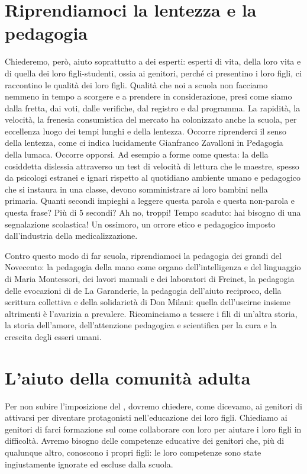 \section*{Riprendiamoci la lentezza e la pedagogia}

Chiederemo, però, aiuto soprattutto a dei  esperti: esperti di vita, della loro vita e di quella dei loro figli-studenti, ossia ai genitori, perché ci presentino i loro figli, ci raccontino le qualità dei loro figli. Qualità che noi a scuola non facciamo nemmeno in tempo a scorgere e a prendere in considerazione, presi come siamo dalla fretta, dai voti, dalle verifiche, dal registro e dal programma. La rapidità, la velocità, la frenesia consumistica del mercato ha colonizzato anche la scuola, per eccellenza luogo dei tempi lunghi e della lentezza. Occorre riprenderci il senso della lentezza, come ci indica lucidamente Gianfranco Zavalloni in Pedagogia della lumaca. Occorre opporsi. Ad esempio a forme come questa: la  della cosiddetta dislessia attraverso un test di velocità di lettura che le maestre, spesso  da psicologi estranei e ignari rispetto al quotidiano ambiente umano e pedagogico che si instaura in una classe, devono somministrare ai loro bambini nella primaria. Quanti secondi impieghi a leggere questa parola e questa non-parola e questa frase? Più di 5 secondi? Ah no, troppi! Tempo scaduto: hai bisogno di una segnalazione scolastica! Un ossimoro, un orrore etico e pedagogico imposto dall'industria della medicalizzazione.

Contro questo modo di far scuola, riprendiamoci la pedagogia dei grandi del Novecento: la pedagogia della mano come organo dell'intelligenza e del linguaggio di Maria Montessori, dei lavori manuali e dei laboratori di Freinet, la pedagogia delle evocazioni di de La Garanderie, la pedagogia dell'aiuto reciproco, della scrittura collettiva e della solidarietà di Don Milani: quella dell'uscirne insieme altrimenti è l'avarizia a prevalere. Ricominciamo a tessere i fili di un'altra storia, la storia dell'amore, dell'attenzione pedagogica e scientifica per la cura e la crescita degli esseri umani.
\section*{L'aiuto della comunità adulta}

Per non subire l'imposizione del , dovremo chiedere, come dicevamo, ai genitori di attivarsi per diventare protagonisti nell'educazione dei loro figli. Chiediamo ai genitori di farci formazione sul come collaborare con loro per aiutare i loro figli in difficoltà. Avremo bisogno delle competenze educative dei genitori che, più di qualunque altro, conoscono i propri figli: le loro competenze sono state ingiustamente ignorate ed escluse dalla scuola.


